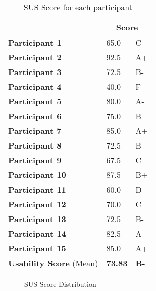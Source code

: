 \documentclass[../mpaper.tex]{subfiles}
\begin{document}
\begin{table}
\centering
\setlength{\tabcolsep}{10pt}
\renewcommand{\arraystretch}{1.5}
\begin{tabular}{|p{3.2cm}|p{1.4cm}p{1.4cm}|}
\hline
                        & \multicolumn{2}{c|}{\textbf{Score}} \\ \hline
\rowcolor[HTML]{EFEFEF} 
\textbf{Participant 1}  & 65.0              & C              \\
\textbf{Participant 2}  & 92.5              & A+              \\
\rowcolor[HTML]{EFEFEF} 
\textbf{Participant 3}  & 72.5              & B-              \\
\textbf{Participant 4}  & 40.0              & F                \\
\rowcolor[HTML]{EFEFEF} 
\textbf{Participant 5}  & 80.0              & A-              \\
\textbf{Participant 6}  & 75.0              & B              \\
\rowcolor[HTML]{EFEFEF} 
\textbf{Participant 7}  & 85.0              & A+              \\
\textbf{Participant 8}  & 72.5              & B-              \\
\rowcolor[HTML]{EFEFEF} 
\textbf{Participant 9}  & 67.5              & C              \\
\textbf{Participant 10} & 87.5              & B+              \\
\rowcolor[HTML]{EFEFEF} 
\textbf{Participant 11} & 60.0              & D              \\
\textbf{Participant 12} & 70.0              & C              \\
\rowcolor[HTML]{EFEFEF} 
\textbf{Participant 13} & 72.5              & B-              \\
\textbf{Participant 14} & 82.5              & A              \\
\rowcolor[HTML]{EFEFEF} 
\textbf{Participant 15} & 85.0              & A+              \\ \hline
\rowcolor[HTML]{E0E0E0} 
{\scriptsize\textbf{Usability Score} (Mean)}        & \textbf{73.83}     & \textbf{B-}     \\ \hline
\end{tabular}
\caption{SUS Score for each participant}\label{fig:participant_scores}
\end{table}

\begin{figure}
    \centering
    \caption{SUS Score Distribution}
    \label{fig:score_distribution}
\end{figure}
\end{document}
